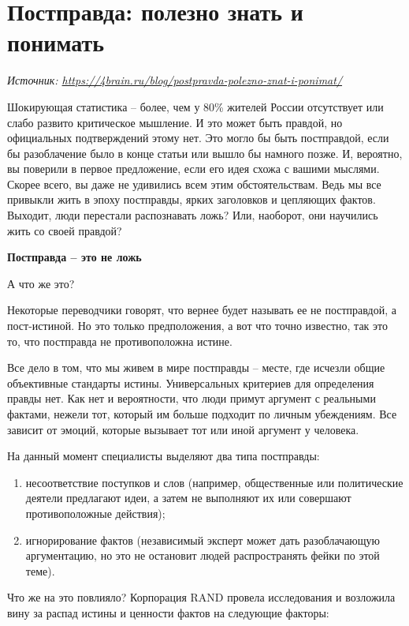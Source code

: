 \newpage
\section{Постправда: полезно знать и понимать}

\textit{Источник: \url{https://4brain.ru/blog/postpravda-polezno-znat-i-ponimat/}}

Шокирующая статистика – более, чем у 80\% жителей России отсутствует или слабо развито критическое мышление. И это может быть правдой, но официальных подтверждений этому нет. Это могло бы быть постправдой, если бы разоблачение было в конце статьи или вышло бы намного позже. И, вероятно, вы поверили в первое предложение, если его идея схожа с вашими мыслями. Скорее всего, вы даже не удивились всем этим обстоятельствам. Ведь мы все привыкли жить в эпоху постправды, ярких заголовков и цепляющих фактов. Выходит, люди перестали распознавать ложь? Или, наоборот, они научились жить со своей правдой?

\textbf{Постправда – это не ложь}

А что же это?

Некоторые переводчики говорят, что вернее будет называть ее не постправдой, а пост-истиной. Но это только предположения, а вот что точно известно, так это то, что постправда не противоположна истине.

Все дело в том, что мы живем в мире постправды – месте, где исчезли общие объективные стандарты истины. Универсальных критериев для определения правды нет. Как нет и вероятности, что люди примут аргумент с реальными фактами, нежели тот, который им больше подходит по личным убеждениям. Все зависит от эмоций, которые вызывает тот или иной аргумент у человека.

На данный момент специалисты выделяют два типа постправды:

\begin{enumerate}
    \item несоответствие поступков и слов (например, общественные или политические деятели предлагают идеи, а затем не выполняют их или совершают противоположные действия);
    \item игнорирование фактов (независимый эксперт может дать разоблачающую аргументацию, но это не остановит людей распространять фейки по этой теме).
\end{enumerate}

Что же на это повлияло? Корпорация RAND провела исследования и возложила вину за распад истины и ценности фактов на следующие факторы:

